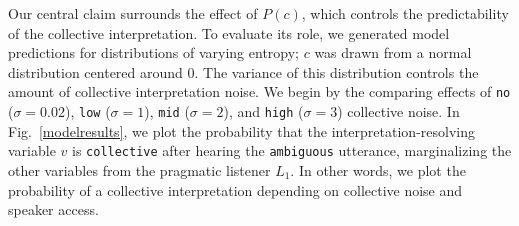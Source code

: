 \documentclass[preprint,12pt,authoryear,titlepage]{elsarticle}
\begin{document}
Our central claim surrounds the effect of $P(c)$, which controls the predictability of the collective interpretation. To evaluate its role, we generated model predictions for distributions of varying entropy; $c$ was drawn from a normal distribution centered around $0$. The variance of this distribution controls the amount of collective interpretation noise. We begin by the comparing effects of \texttt{no} ($\sigma=0.02$), \texttt{low} ($\sigma=1$), \texttt{mid} ($\sigma=2$), and \texttt{high} ($\sigma=3$) collective noise.
%
%
In Fig.~\ref{modelresults}, we plot the probability that the interpretation-resolving variable $v$ is \texttt{collective} after hearing the \texttt{ambiguous} utterance, marginalizing the other variables from the pragmatic listener $L_1$. In other words, we plot the probability of a collective interpretation depending on collective noise and speaker access.%

\end{document}
